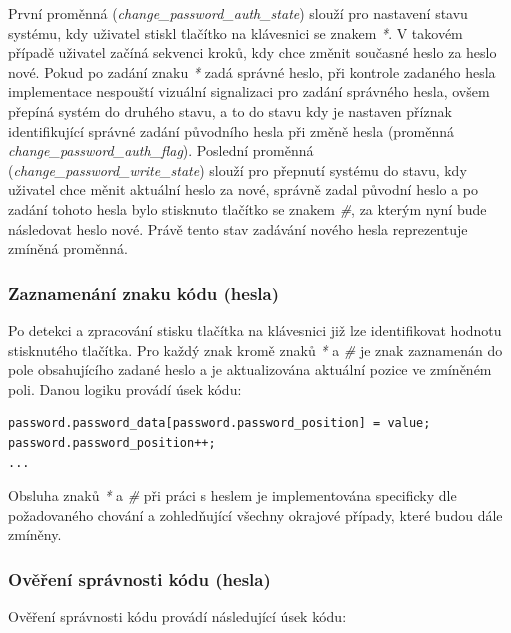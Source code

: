\documentclass[a4paper, 12pt]{article}
\begin{document}
První proměnná (\textit{change\_password\_auth\_state}) slouží pro nastavení stavu systému, kdy uživatel stiskl tlačítko na klávesnici se znakem \textit{*}. V takovém případě uživatel začíná sekvenci kroků, kdy chce změnit současné heslo za heslo nové. Pokud po zadání znaku \textit{*} zadá správné heslo, při kontrole zadaného hesla implementace nespouští vizuální signalizaci pro zadání správného hesla, ovšem přepíná systém do druhého stavu, a to do stavu kdy je nastaven příznak identifikující správné zadání původního hesla při změně hesla (proměnná \textit{\textit{change\_password\_auth\_flag}}). Poslední proměnná (\textit{change\_password\_write\_state}) slouží pro přepnutí systému do stavu, kdy uživatel chce měnit aktuální heslo za nové, správně zadal původní heslo a po zadání tohoto hesla bylo stisknuto tlačítko se znakem \textit{\#}, za kterým nyní bude následovat heslo nové. Právě tento stav zadávání nového hesla reprezentuje zmíněná proměnná.

\subsubsection*{Zaznamenání znaku kódu (hesla)}
Po detekci a zpracování stisku tlačítka na klávesnici již lze identifikovat hodnotu stisknutého tlačítka. Pro každý znak kromě znaků \textit{*} a \textit{\#} je znak zaznamenán do pole obsahujícího zadané heslo a je aktualizována aktuální pozice ve zmíněném poli. Danou logiku provádí úsek kódu:

\begin{lstlisting}[style=CLanguage]
password.password_data[password.password_position] = value;
password.password_position++;
...
\end{lstlisting}

Obsluha znaků \textit{*} a \textit{\#} při práci s heslem je implementována specificky dle požadovaného chování a zohledňující všechny okrajové případy, které budou dále zmíněny.

\subsubsection*{Ověření správnosti kódu (hesla)}
Ověření správnosti kódu provádí následující úsek kódu:
\end{document}
